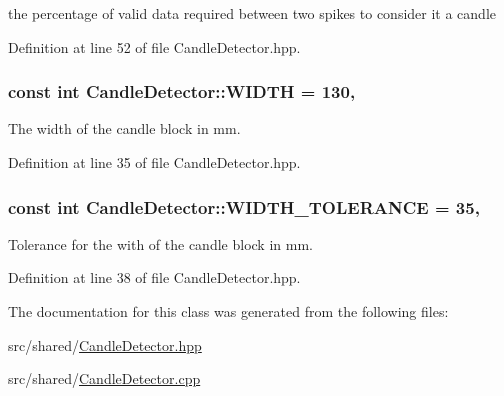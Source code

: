 the percentage of valid data required between two spikes to consider it a candle 



Definition at line 52 of file Candle\-Detector.\-hpp.

\hypertarget{classCandleDetector_af4c5d2170cea56fa4263639f20ed13ed}{
\subsubsection[{W\-I\-D\-T\-H}]{\setlength{\rightskip}{0pt plus 5cm}const int Candle\-Detector\-::\-W\-I\-D\-T\-H = 130\hspace{0.3cm}{\ttfamily [static]}, {\ttfamily [private]}}}\label{classCandleDetector_af4c5d2170cea56fa4263639f20ed13ed}


The width of the candle block in mm. 



Definition at line 35 of file Candle\-Detector.\-hpp.

\hypertarget{classCandleDetector_a1c8f0232491ba37dd10032c1da376145}{
\subsubsection[{W\-I\-D\-T\-H\-\_\-\-T\-O\-L\-E\-R\-A\-N\-C\-E}]{\setlength{\rightskip}{0pt plus 5cm}const int Candle\-Detector\-::\-W\-I\-D\-T\-H\-\_\-\-T\-O\-L\-E\-R\-A\-N\-C\-E = 35\hspace{0.3cm}{\ttfamily [static]}, {\ttfamily [private]}}}\label{classCandleDetector_a1c8f0232491ba37dd10032c1da376145}


Tolerance for the with of the candle block in mm. 



Definition at line 38 of file Candle\-Detector.\-hpp.



The documentation for this class was generated from the following files\-:\begin{DoxyCompactItemize}
\item 
src/shared/\hyperlink{CandleDetector_8hpp}{Candle\-Detector.\-hpp}\item 
src/shared/\hyperlink{CandleDetector_8cpp}{Candle\-Detector.\-cpp}\end{DoxyCompactItemize}
